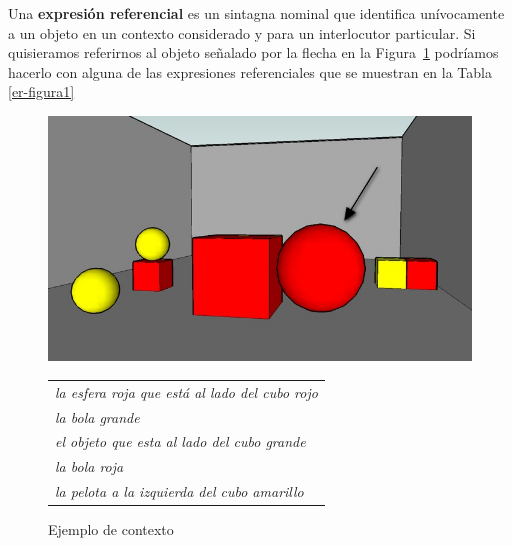 Una {\bf expresi\'on referencial} es un sintagna nominal que identifica un\'ivocamente a un objeto en un contexto considerado y para un interlocutor particular. Si quisieramos referirnos al objeto se\~nalado por la flecha en la Figura~\ref{GRE3D7-stimulus1} podr\'iamos hacerlo con alguna de las expresiones referenciales que se muestran en la Tabla \ref{er-figura1}
\begin{figure}[!ht]
\begin{minipage}[t]{0.5\linewidth}
\centering
\includegraphics[width=\textwidth]{images/22sinletras.jpg}
\caption{Ejemplo de contexto}
\label{GRE3D7-stimulus1}

\end{minipage}
\hspace*{0cm}
\begin{minipage}[t]{0.5\linewidth}
\centering
\vspace*{-5cm}

\begin{tabular}{l}
 {\it la esfera roja que est\'a al lado del cubo rojo} \\

 {\it la bola grande}\\

 {\it el objeto que esta al lado del cubo grande}\\

 {\it la bola roja}\\

 {\it la pelota a la izquierda del cubo amarillo}\\


\end{tabular}
\end{minipage}
\end{figure}
